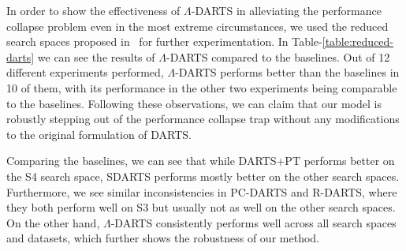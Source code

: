 \documentclass{article} \usepackage{fancyhdr, iclr2023_conference, times}
\newcommand{\mydarts}{$\Lambda$-DARTS\xspace}
\begin{document}
\par In order to show the effectiveness of \mydarts in alleviating the performance collapse problem even in the most extreme circumstances, we used the reduced search spaces proposed in~\citep{DBLP:conf/iclr/ZelaESMBH20} for further experimentation. In Table-\ref{table:reduced-darts} we can see the results of \mydarts compared to the baselines. Out of 12 different experiments performed, \mydarts performs better than the baselines in 10 of them, with its performance in the other two experiments being comparable to the baselines. Following these observations, we can claim that our model is robustly stepping out of the performance collapse trap without any modifications to the original formulation of DARTS. 
\par Comparing the baselines, we can see that while DARTS+PT performs better on the S4 search space, SDARTS performs mostly better on the other search spaces. Furthermore, we see similar inconsistencies in PC-DARTS and R-DARTS, where they both perform well on S3 but usually not as well on the other search spaces. On the other hand, \mydarts consistently performs well across all search spaces and datasets, which further shows the robustness of our method. 
\end{document}

